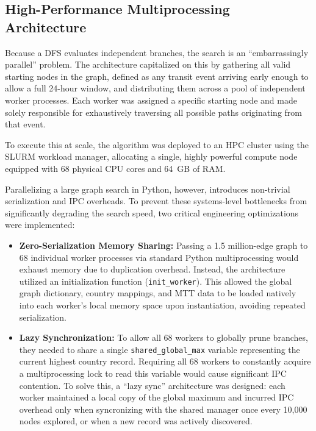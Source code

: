 \subsection{High-Performance Multiprocessing Architecture}
\label{subsec:hpc_multiprocessing}

Because a DFS evaluates independent branches, the search is an ``embarrassingly parallel'' problem. The architecture capitalized on this by gathering all valid starting nodes in the graph, defined as any transit event arriving early enough to allow a full 24-hour window, and distributing them across a pool of independent worker processes. Each worker was assigned a specific starting node and made solely responsible for exhaustively traversing all possible paths originating from that event.

\medskip

To execute this at scale, the algorithm was deployed to an HPC cluster using the SLURM workload manager, allocating a single, highly powerful compute node equipped with 68 physical CPU cores and 64~GB of RAM.

\medskip

Parallelizing a large graph search in Python, however, introduces non-trivial serialization and IPC overheads. To prevent these systems-level bottlenecks from significantly degrading the search speed, two critical engineering optimizations were implemented:
\begin{itemize}
    \item \textbf{Zero-Serialization Memory Sharing:} Passing a 1.5 million-edge graph to 68 individual worker processes via standard Python multiprocessing would exhaust memory due to duplication overhead. Instead, the architecture utilized an initialization function (\texttt{init\_worker}). This allowed the global graph dictionary, country mappings, and MTT data to be loaded natively into each worker's local memory space upon instantiation, avoiding repeated serialization.
    \item \textbf{Lazy Synchronization:} To allow all 68 workers to globally prune branches, they needed to share a single \texttt{shared\_global\_max} variable representing the current highest country record. Requiring all 68 workers to constantly acquire a multiprocessing lock to read this variable would cause significant IPC contention. To solve this, a ``lazy sync'' architecture was designed: each worker maintained a local copy of the global maximum and incurred IPC overhead only when syncronizing with the shared manager once every 10,000 nodes explored, or when a new record was actively discovered.
\end{itemize}

